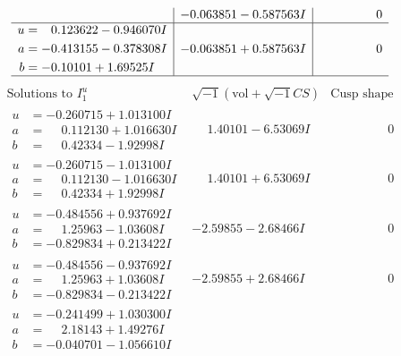 \documentclass[1p]{elsarticle_modified}
\theoremstyle{definition}
\newcommand{\I}{\sqrt{-1}}
\begin{document}
$$\begin{array}{c|c|c}
 & -0.063851 - 0.587563 I & \phantom{-0.000000 } 0 \\ \hline\begin{aligned}
u &= \phantom{-}0.123622 - 0.946070 I \\
a &= -0.413155 - 0.378308 I \\
b &= -0.10101 + 1.69525 I\end{aligned}
 & -0.063851 + 0.587563 I & \phantom{-0.000000 } 0\\
 \hline 
 \end{array}$$\newpage$$\begin{array}{c|c|c}  
\text{Solutions to }I^u_{1}& \I (\text{vol} + \sqrt{-1}CS) & \text{Cusp shape}\\
 \hline 
\begin{aligned}
u &= -0.260715 + 1.013100 I \\
a &= \phantom{-}0.112130 + 1.016630 I \\
b &= \phantom{-}0.42334 - 1.92998 I\end{aligned}
 & \phantom{-}1.40101 - 6.53069 I & \phantom{-0.000000 } 0 \\ \hline\begin{aligned}
u &= -0.260715 - 1.013100 I \\
a &= \phantom{-}0.112130 - 1.016630 I \\
b &= \phantom{-}0.42334 + 1.92998 I\end{aligned}
 & \phantom{-}1.40101 + 6.53069 I & \phantom{-0.000000 } 0 \\ \hline\begin{aligned}
u &= -0.484556 + 0.937692 I \\
a &= \phantom{-}1.25963 - 1.03608 I \\
b &= -0.829834 + 0.213422 I\end{aligned}
 & -2.59855 - 2.68466 I & \phantom{-0.000000 } 0 \\ \hline\begin{aligned}
u &= -0.484556 - 0.937692 I \\
a &= \phantom{-}1.25963 + 1.03608 I \\
b &= -0.829834 - 0.213422 I\end{aligned}
 & -2.59855 + 2.68466 I & \phantom{-0.000000 } 0 \\ \hline\begin{aligned}
u &= -0.241499 + 1.030300 I \\
a &= \phantom{-}2.18143 + 1.49276 I \\
b &= -0.040701 - 1.056610 I\end{aligned}

\end{array}$$
\end{document}
